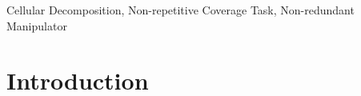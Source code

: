 \documentclass[journal]{IEEEtran}
\begin{document}
\begin{IEEEkeywords}
Cellular Decomposition, Non-repetitive Coverage Task, Non-redundant Manipulator
\end{IEEEkeywords}


%
\IEEEpeerreviewmaketitle

\section{Introduction}
% 
% 
% 
% 
\end{document}
